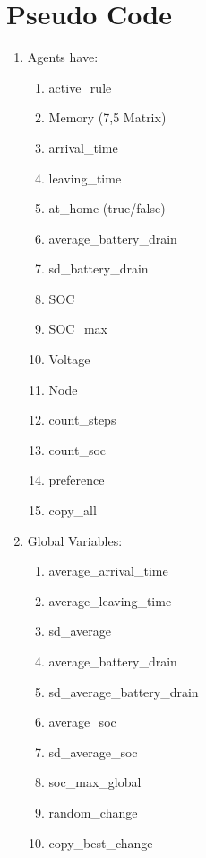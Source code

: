 \documentclass[a4paper]{article}
\begin{document}
\newpage
\section{Pseudo Code}
\begin{enumerate}
 \item Agents have:\begin{enumerate}
                    \item active\_rule
                    \item Memory (7,5 Matrix)
                    \item arrival\_time
                    \item leaving\_time
                    \item at\_home (true/false)
                    \item average\_battery\_drain
                    \item sd\_battery\_drain
                    \item SOC
                    \item SOC\_max
                    \item Voltage
                    \item Node
                    \item count\_steps
                    \item count\_soc
                    \item preference
                    \item copy\_all
                   \end{enumerate}
 \item Global Variables: \begin{enumerate}
                          \item average\_arrival\_time
                          \item average\_leaving\_time
                          \item sd\_average
                          \item average\_battery\_drain
                          \item sd\_average\_battery\_drain
                          \item average\_soc
                          \item sd\_average\_soc
                          \item soc\_max\_global
                          \item random\_change
                          \item copy\_best\_change

\end{enumerate}
\end{enumerate}
\end{document}
